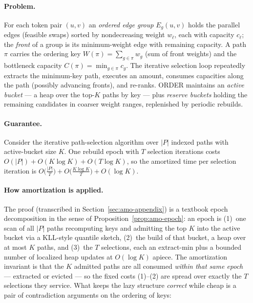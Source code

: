\paragraph{Problem.}
For each token pair $(u,v)$ an \emph{ordered edge group} $E_g(u,v)$ holds
the parallel edges (feasible swaps) sorted by nondecreasing weight
$w_\ell$, each with capacity $c_\ell$; the \emph{front} of a group is its
minimum-weight edge with remaining capacity. A path $\pi$ carries the
ordering key $W(\pi) = \sum_{g \in \pi} w_g$ (sum of front weights) and
the bottleneck capacity $C(\pi) = \min_{g \in \pi} c_g$. The iterative
selection loop repeatedly extracts the minimum-key path, executes an
amount, consumes capacities along the path (possibly advancing fronts),
and re-ranks. ORDER maintains an \emph{active bucket} --- a heap over the
top-$K$ paths by key --- plus \emph{reserve buckets} holding the remaining
candidates in coarser weight ranges, replenished by periodic rebuilds.

\paragraph{Guarantee.}

\begin{theorem}\label{thm:amo-order-amort}
Consider the iterative path-selection algorithm over $|P|$ indexed paths
with active-bucket size $K$. One rebuild epoch with $T$ selection
iterations costs $O(|P|) + O(K \log K) + O(T \log K)$, so the amortized
time per selection iteration is $O\bigl(\tfrac{|P|}{T}\bigr) +
O\bigl(\tfrac{K \log K}{T}\bigr) + O(\log K)$. \eop
\end{theorem}

\paragraph{How amortization is applied.}
The proof (transcribed in Section~\ref{sec:amo-appendix}) is a textbook
epoch decomposition in the sense of Proposition~\ref{prop:amo-epoch}: an
epoch is (1)~one scan of all $|P|$ paths recomputing keys and admitting
the top $K$ into the active bucket via a KLL-style quantile sketch, (2)~the
build of that bucket, a heap over at most $K$ paths, and (3)~the $T$
selections, each an extract-min plus a bounded number of localized heap
updates at $O(\log K)$ apiece. The amortization invariant is that the $K$
admitted paths are all consumed \emph{within that same epoch} --- extracted
or evicted --- so the fixed costs (1)--(2) are spread over exactly the $T$
selections they service. What keeps the lazy structure \emph{correct}
while cheap is a pair of contradiction arguments on the ordering of keys:


